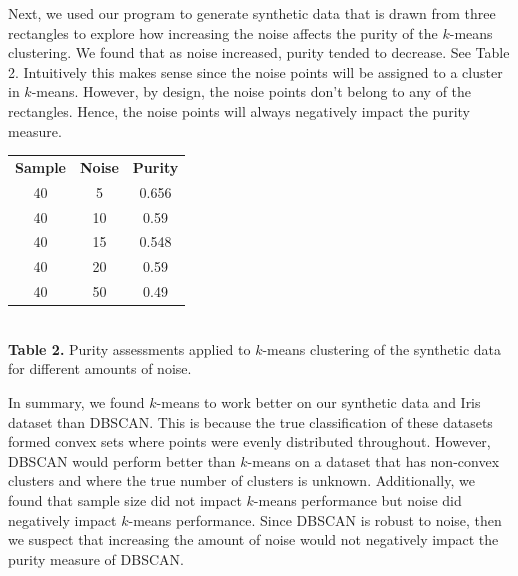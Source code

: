 \documentclass[psamsfonts,onesided,10pt]{amsart}
\begin{document}
Next, we used our program to generate synthetic data that is drawn from three rectangles to 
explore how increasing the noise affects the purity of the $k$-means clustering. We found that 
as noise increased, purity tended to decrease. See Table 2. Intuitively this makes sense since the 
noise points will be assigned to a cluster in $k$-means. However, by design, the noise points 
don't belong to any of the rectangles. Hence, the noise points will always negatively impact the purity measure. 

\vspace{1ex}
\begin{center}
\begin{tabular}{ |c|c|c| } 
 \hline
\textbf{Sample} & \textbf{Noise} & \textbf{Purity}\\ 
40 & 5 & 0.656 \\ 
40 & 10 & 0.59 \\ 
40 & 15 & 0.548 \\ 
40 & 20 & 0.59 \\ 
40 & 50 & 0.49 \\ 
 \hline
\end{tabular}\\
\textbf{Table 2.} Purity assessments applied to $k$-means clustering of the synthetic data for 
different amounts of noise.
\end{center}
\vspace{1ex}

In summary, we found $k$-means to work better on our synthetic data and Iris dataset than 
DBSCAN. This is because the true classification of these datasets formed convex sets where 
points were evenly distributed throughout. However, DBSCAN would perform better than 
$k$-means on a dataset that has non-convex clusters and where the true number of clusters is 
unknown. Additionally, we found that sample size did not impact $k$-means performance but 
noise did negatively impact $k$-means performance. Since DBSCAN is robust to noise, then we 
suspect that increasing the amount of noise would not negatively impact the purity measure of DBSCAN.
\end{document}

